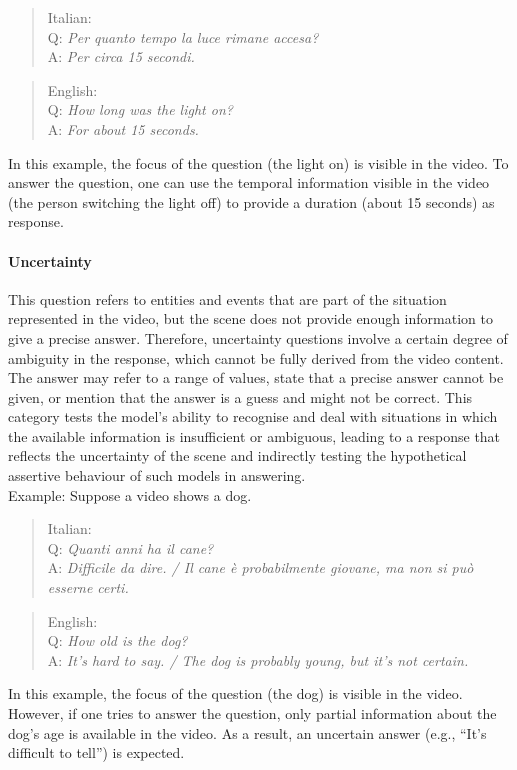 \begin{itemize}
     \begin{quote}
        Italian:\\
Q: \textit{Per quanto tempo la luce rimane accesa?}\\
A: \textit{Per circa 15 secondi.}\\
    \end{quote}

    
    \begin{quote}
        English:\\
Q: \textit{How long was the light on?}\\
A: \textit{For about 15 seconds.}\\
    \end{quote}
In this example, the focus of the question (the light on) is visible in the video. To answer the question, one can use the temporal information visible in the video (the person switching the light off) to provide a duration (about 15 seconds) as response.
\end{itemize}


\paragraph{{\textbf{Uncertainty}}}
This question refers to entities and events that are part of the situation represented in the video, but the scene does not provide enough information to give a precise answer. Therefore, uncertainty questions involve a certain degree of ambiguity in the response, which cannot be fully derived from the video content. The answer may refer to a range of values, state that a precise answer cannot be given, or mention that the answer is a guess and might not be correct. This category tests the model's ability to recognise and deal with situations in which the available information is insufficient or ambiguous, leading to a response that reflects the uncertainty of the scene and indirectly testing the hypothetical assertive behaviour of such models in answering.\\
Example: Suppose a video shows a dog.


\begin{quote}
        Italian:\\
Q: \textit{Quanti anni ha il cane?}\\
A: \textit{Difficile da dire. / Il cane è probabilmente giovane, ma non si può esserne certi.}\\
    \end{quote}

    \begin{quote}
        English:\\
Q: \textit{How old is the dog?}\\
A: \textit{It's hard to say. / The dog is probably young, but it's not certain.}\\
    \end{quote}
In this example, the focus of the question (the dog) is visible in the video. However, if one tries to answer the question, only partial information about the dog’s age is available in the video. As a result, an uncertain answer (e.g., “It's difficult to tell”) is expected.


